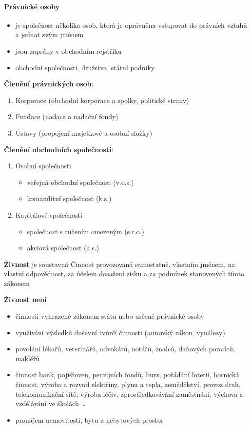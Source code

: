 \paragraph*{Právnické osoby}
\begin{itemize}
    \item je společnost několika osob, která je oprávněna vstupovat do právních vztahů a jednat svým jménem
    \item jsou zapsány v obchodním rejstříku
    \item obchodní společnosti, družstva, státní podniky
\end{itemize}

\textbf{Členění právnických osob}:
\begin{enumerate}
    \item Korporace (obchodní korporace a spolky, politické strany)
    \item Fundace (nadace a nadační fondy)
    \item Ústavy (propojení majetkové a osobní složky)
\end{enumerate}

\textbf{Členění obchodních společností}:
\begin{enumerate}
    \item Osobní společnosti
    \begin{itemize}
        \item veřejná obchodní společnost (v.o.s.)
        \item komanditní společnost (k.s.)
    \end{itemize}
    \item Kapitálové společnosti
    \begin{itemize}
        \item společnost s ručením omezeným (s.r.o.)
        \item akciová společnost (a.s.)
    \end{itemize}
\end{enumerate}


\textbf{Živnost} je soustavná Činnost provozovaná samostatně, vlastním jménem, na vlastní
odpovědnost, za účelem dosažení zisku a za podmínek stanovených tímto zákonem

\textbf{Živnost není}
\begin{itemize}
    \item činnosti vyhrazené zákonem státu nebo určené právnické osoby
    \item využívání výsledků duševní tvůrčí činnosti (autorský zákon, vynálezy)
    \item povolání lékařů, veterinářů, advokátů, notářů, znalců, daňových poradců, makléřů
    \item činnost bank, pojišťoven, penzijních fondů, burz, pořádání loterií, hornická činnost, výroba a rozvod elektřiny, plynu a tepla, zemědělství, provoz drah, telekomunikační sítě, výroba léčiv, zprostředkovávání zaměstnání, výchova a vzdělávání ve školách \ldots
    \item pronájem nemovitostí, bytu a nebytových prostor
\end{itemize}

